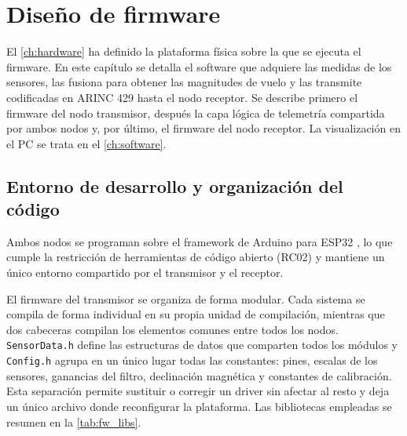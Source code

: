 
\chapter{Diseño de firmware}
\label{ch:firmware}

El \cref{ch:hardware} ha definido la plataforma física sobre la que se ejecuta
el firmware. En este capítulo se detalla el software que adquiere las
medidas de los sensores, las fusiona para obtener las magnitudes de vuelo y las
transmite codificadas en ARINC 429 hasta el nodo receptor. Se describe primero
el firmware del nodo transmisor, después la capa lógica de telemetría
compartida por ambos nodos y, por último, el firmware del nodo receptor. La
visualización en el PC se trata en el \cref{ch:software}.


\section{Entorno de desarrollo y organización del código}
\label{sec:fw_entorno}

Ambos nodos se programan sobre el framework de Arduino para ESP32
\cite{ds_esp32s3, ds_esp32c3}, lo que cumple la restricción de herramientas de
código abierto (RC02) y mantiene un único entorno compartido por el transmisor
y el receptor.

El firmware del transmisor se organiza de forma modular. Cada sistema se compila de forma individual en su propia unidad de compilación, mientras que dos cabeceras compilan los elementos comunes entre todos los nodos. \texttt{SensorData.h} define las estructuras de datos
que comparten todos los módulos y \texttt{Config.h} agrupa en un único lugar todas las constantes: pines, escalas de los
sensores, ganancias del filtro, declinación magnética y constantes de
calibración. Esta separación permite sustituir o corregir un driver sin afectar
al resto y deja un único archivo donde reconfigurar la plataforma. Las
bibliotecas empleadas se resumen en la \cref{tab:fw_libs}.

